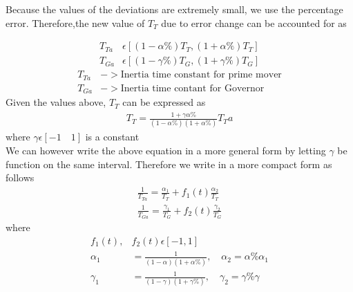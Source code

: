 \documentclass[journal]{IEEEtran}
\begin{document}
 Because the values of the deviations are extremely small, we use the percentage error.
 Therefore,the new value of $T_T$ due to error change can be accounted for as

 \begin{align}
   T_{Ta} &\epsilon [(1-\alpha \%)T_T, (1+\alpha\%)T_T] \\
   T_{Ga} &\epsilon [(1-\gamma \%)T_G, (1+\gamma\%)T_G]
 \end{align}
 \begin{align}
   T_{Ta} &-> \text{Inertia time constant for prime mover} \\
   T_{Ga} &-> \text{Inertia time contant for Governor}
 \end{align}
  Given the values above, $T_T$ can be expressed as
  \begin{align}
    T_T = \frac{1+\gamma \alpha \%}{(1-\alpha \%)(1+\alpha \%)} T_Ta
  \end{align}
  where $\gamma \epsilon [-1\quad1]$ is a constant \\ 
   
  We can however write the above equation in a more general form by letting $\gamma$ be function 
  on the same interval. Therefore we write in a more compact form as follows
 \begin{align}
   \frac{1}{T_{Ta}} = \frac{\alpha _1}{T_T} + f_1(t)\frac{\alpha _2}{T_T}\\
   \frac{1}{T_{Ga}} = \frac{\gamma _1}{T_G} + f_2(t)\frac{\gamma _2}{T_G}
\end{align}
 where 
 \begin{align}
   f_1(t),&f_2(t) \epsilon  [-1,1] \\
   \alpha _1 &= \frac{1}{(1-\alpha)(1+\alpha\%)} , \quad \alpha _2 = \alpha\% \alpha _1 \\
   \gamma _1 &= \frac{1}{(1-\gamma)(1+\gamma\%)} , \quad \gamma _2 = \gamma \%\gamma
 \end{align}
\end{document}
